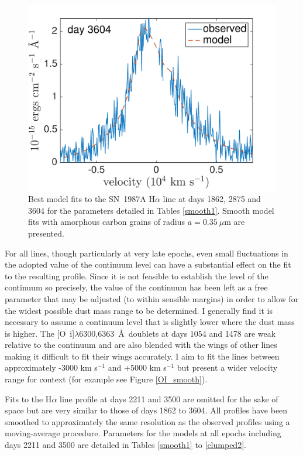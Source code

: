 \begin{figure}
\includegraphics[trim =0 0 0 -30,clip=true,scale=0.37]{chapters/chapter5/images/smooth/best_fit/d3604Ha.pdf}
\caption{Best model fits to the SN~1987A H$\alpha$ line at days 1862, 2875 and 
3604 for the parameters detailed in Tables \ref{smooth1}.  Smooth model fits with amorphous carbon grains of radius $a=0.35~\mu$m are presented.}
\label{smooth_late}
\end{figure}



For all lines, though particularly at very late epochs, even small 
fluctuations in the adopted value of the continuum level can have a 
substantial effect on the fit to the resulting profile.  Since it is not 
feasible to establish the level of the continuum so precisely, the value 
of the continuum has been left as a free parameter that may be adjusted 
(to within sensible margins) in order to allow for the widest possible 
dust mass range to be determined.  I generally find it is necessary to 
assume a continuum level that is slightly lower where the dust mass is 
higher.  The [O~{\sc i}]$\lambda$6300,6363~\AA\ doublets at days 1054 and 
1478 are weak relative to the continuum and are also blended with the 
wings of other lines making it difficult to fit their wings accurately.  
I aim to fit the lines between approximately -3000 km s$^{-1}$ and +5000 
km s$^{-1}$ but present a wider velocity range for context (for example 
see Figure \ref{OI_smooth}).


Fits to the H$\alpha$ line profile at days 2211 and 3500 are omitted for 
the sake of space but are very similar to those of days 1862 to 3604.  
All profiles have been smoothed to approximately the same resolution as 
the observed profiles using a moving-average procedure.  Parameters for 
the models at all epochs including days 2211 and 3500 are detailed in 
Tables \ref{smooth1} to \ref{clumped2}.


